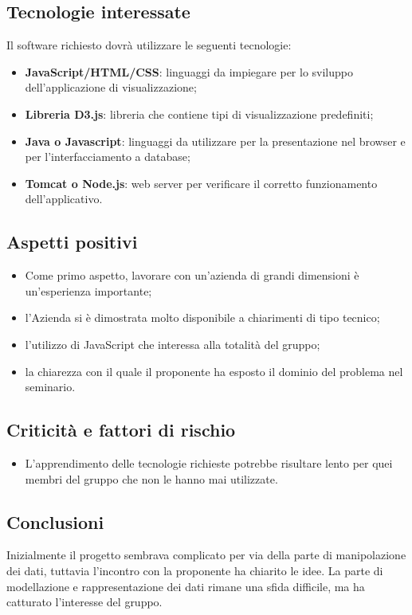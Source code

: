 \subsection{Tecnologie interessate}
Il software richiesto dovrà utilizzare le seguenti tecnologie:
\begin{itemize}
	\item \textbf{JavaScript/HTML/CSS}: linguaggi da impiegare per lo sviluppo dell'applicazione di visualizzazione;
	\item \textbf{Libreria D3.js}: libreria che contiene tipi di visualizzazione predefiniti;
	\item \textbf{Java o Javascript}: linguaggi da utilizzare per la presentazione nel browser e per l'interfacciamento a database;
	\item \textbf{Tomcat o Node.js}: web server per verificare il corretto funzionamento dell'applicativo.
\end{itemize}
\subsection{Aspetti positivi}
\begin{itemize}
	\item Come primo aspetto, lavorare con un'azienda di grandi dimensioni è un'esperienza importante;
	\item l'Azienda si è dimostrata molto disponibile a chiarimenti di tipo tecnico;
	\item l'utilizzo di JavaScript che interessa alla totalità del gruppo;
	\item la chiarezza con il quale il proponente ha esposto il dominio del problema nel seminario.
\end{itemize}
\subsection{Criticità e fattori di rischio}
\begin{itemize}
	\item L'apprendimento delle tecnologie richieste potrebbe risultare lento per quei membri del gruppo che non le hanno mai utilizzate.
\end{itemize}
\subsection{Conclusioni}
Inizialmente il progetto sembrava complicato per via della parte di manipolazione dei dati, tuttavia l'incontro con la proponente ha chiarito le idee. La parte di modellazione e rappresentazione dei dati rimane una sfida difficile, ma ha catturato l'interesse del gruppo.